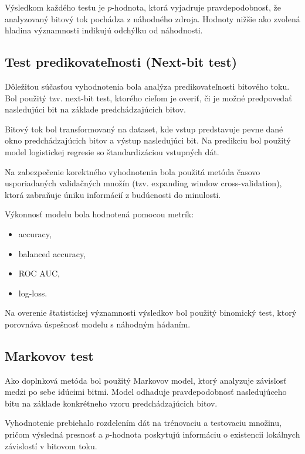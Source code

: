Výsledkom každého testu je $p$-hodnota, ktorá vyjadruje pravdepodobnosť, že analyzovaný bitový tok pochádza z náhodného zdroja. Hodnoty nižšie ako zvolená hladina významnosti indikujú odchýlku od náhodnosti.


\subsection{Test predikovateľnosti (Next-bit test)}


Dôležitou súčasťou vyhodnotenia bola analýza predikovateľnosti bitového toku. Bol použitý tzv. next-bit test, ktorého cieľom je overiť, či je možné predpovedať nasledujúci bit na základe predchádzajúcich bitov.


Bitový tok bol transformovaný na dataset, kde vstup predstavuje pevne dané okno predchádzajúcich bitov a výstup nasledujúci bit. Na predikciu bol použitý model logistickej regresie so štandardizáciou vstupných dát.


Na zabezpečenie korektného vyhodnotenia bola použitá metóda časovo usporiadaných validačných množín (tzv. expanding window cross-validation), ktorá zabraňuje úniku informácií z budúcnosti do minulosti.


Výkonnosť modelu bola hodnotená pomocou metrík:

\begin{itemize}

  \item accuracy,

  \item balanced accuracy,

  \item ROC AUC,

  \item log-loss.

\end{itemize}


Na overenie štatistickej významnosti výsledkov bol použitý binomický test, ktorý porovnáva úspešnosť modelu s náhodným hádaním.


\subsection{Markovov test}


Ako doplnková metóda bol použitý Markovov model, ktorý analyzuje závislosť medzi po sebe idúcimi bitmi. Model odhaduje pravdepodobnosť nasledujúceho bitu na základe konkrétneho vzoru predchádzajúcich bitov.


Vyhodnotenie prebiehalo rozdelením dát na trénovaciu a testovaciu množinu, pričom výsledná presnosť a $p$-hodnota poskytujú informáciu o existencii lokálnych závislostí v bitovom toku.


